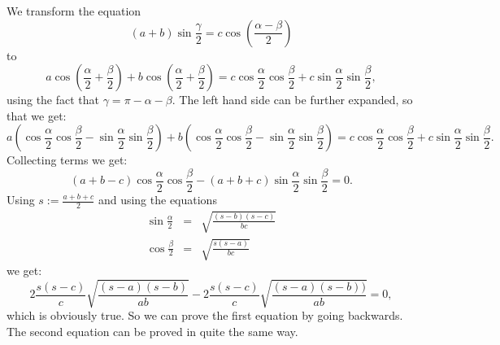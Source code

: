 \documentclass[12pt]{article}
\begin{document}
We transform the equation
$$(a+b)\sin\frac{\gamma}{2}=c\cos\left(\frac{\alpha -\beta}{2}\right)$$
to
$$a\cos\left(\frac{\alpha}{2}+\frac{\beta}{2}\right) +b\cos\left(\frac{\alpha}{2}+\frac{\beta}{2}\right)= c\cos\frac{\alpha}{2}\cos\frac{\beta}{2} +c\sin\frac{\alpha}{2}\sin\frac{\beta}{2} ,$$
using the fact that $\gamma=\pi-\alpha-\beta$. The left hand side can be further expanded, so that we get:
$$a\left(\cos\frac{\alpha}{2}\cos\frac{\beta}{2}- \sin\frac{\alpha}{2}\sin\frac{\beta}{2}\right)+ b\left(\cos\frac{\alpha}{2}\cos\frac{\beta}{2}- \sin\frac{\alpha}{2}\sin\frac{\beta}{2}\right)= c\cos\frac{\alpha}{2}\cos\frac{\beta}{2} +c\sin\frac{\alpha}{2}\sin\frac{\beta}{2}.$$
Collecting terms we get:
$$(a+b-c)\cos\frac{\alpha}{2}\cos\frac{\beta}{2}- (a+b+c)\sin\frac{\alpha}{2}\sin\frac{\beta}{2}=0.$$
Using $s:=\frac{a+b+c}{2}$ and using the equations
\begin{eqnarray*}
\sin\frac{\alpha}{2}&=&\sqrt{\frac{(s-b)(s-c)}{bc}}\\
\cos\frac{\beta}{2}&=&\sqrt{\frac{s(s-a)}{bc}}
\end{eqnarray*}
we get:
$$2\frac{s(s-c)}{c}\sqrt{\frac{(s-a)(s-b)}{ab}}- 2\frac{s(s-c)}{c}\sqrt{\frac{(s-a)(s-b))}{ab}}=0,$$
which is obviously true. So we can prove the first equation by going backwards. The second equation can be proved in quite the same way.
\end{document}
